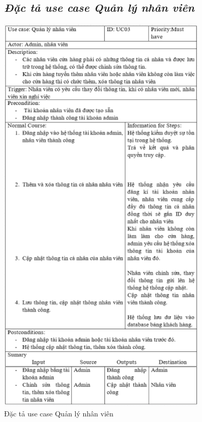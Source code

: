 \documentclass{report}
\begin{document}
\begin{figure}[htp]
    \subsection{\textit{Đặc tả use case Quản lý nhân viên}}
    \centering
    \includegraphics[scale = 1.15]{image/UC03.PNG}
    \caption{Đặc tả use case Quản lý nhân viên}
\end{figure}

\pagebreak
\end{document}

